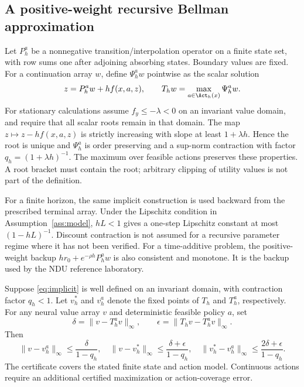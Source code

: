 \subsection{A positive-weight recursive Bellman approximation}
Let $P_h^a$ be a nonnegative transition/interpolation operator on a finite state set, with row sums one after adjoining absorbing states. Boundary values are fixed. For a continuation array $w$, define $\Psi_h^a w$ pointwise as the scalar solution
\begin{equation}\label{eq:implicit}
 z=P_h^a w+h f(x,a,z),\qquad
 T_h w=\max_{a\in\Act_h(x)}\Psi_h^a w.
\end{equation}
For stationary calculations assume $f_y\leq-\lambda<0$ on an invariant value domain, and require that all scalar roots remain in that domain. The map $z\mapsto z-hf(x,a,z)$ is strictly increasing with slope at least $1+\lambda h$. Hence the root is unique and $\Psi_h^a$ is order preserving and a sup-norm contraction with factor $q_h=(1+\lambda h)^{-1}$. The maximum over feasible actions preserves these properties. A root bracket must contain the root; arbitrary clipping of utility values is not part of the definition.

For a finite horizon, the same implicit construction is used backward from the prescribed terminal array. Under the Lipschitz condition in Assumption~\ref{ass:model}, $hL<1$ gives a one-step Lipschitz constant at most $(1-hL)^{-1}$. Discount contraction is not assumed for a recursive parameter regime where it has not been verified. For a time-additive problem, the positive-weight backup $hr_0+e^{-\rho h}P_h^a w$ is also consistent and monotone. It is the backup used by the NDU reference laboratory.

\begin{theorem}\label{thm:discrete}
Suppose \eqref{eq:implicit} is well defined on an invariant domain, with contraction factor $q_h<1$. Let $v_h^*$ and $v_h^a$ denote the fixed points of $T_h$ and $T_h^a$, respectively. For any neural value array $v$ and deterministic feasible policy $a$, set
\[
 \delta=\|v-T_h^av\|_\infty,\qquad
 \epsilon=\|T_hv-T_h^av\|_\infty.
\]
Then
\begin{equation}\label{eq:discretebound}
 \|v-v_h^a\|_\infty\leq\frac\delta{1-q_h},\quad
 \|v-v_h^*\|_\infty\leq\frac{\delta+\epsilon}{1-q_h},\quad
 \|v_h^*-v_h^a\|_\infty\leq\frac{2\delta+\epsilon}{1-q_h}.
\end{equation}
The certificate covers the stated finite state and action model. Continuous actions require an additional certified maximization or action-coverage error.
\end{theorem}

